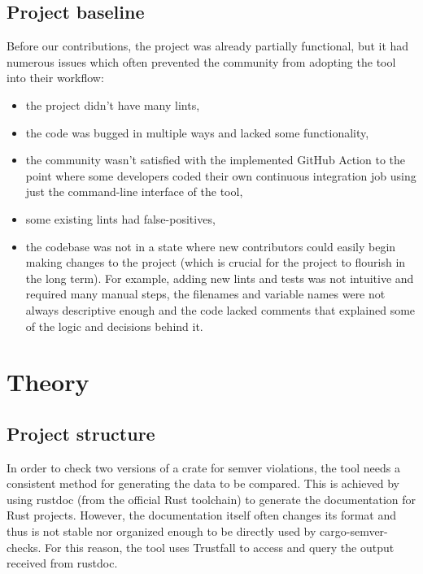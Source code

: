 \documentclass[licencjacka,en]{pracamgr}
\begin{document}
\section{Project baseline}

Before our contributions, the project was already partially functional, but it had numerous issues
which often prevented the community from adopting the tool into their workflow:
\begin{itemize}
	\item the project didn't have many lints,
	\item the code was bugged in multiple ways and lacked some functionality,
	\item the community wasn't satisfied with the implemented GitHub Action to the point where some
		developers coded their own continuous integration job using just the command-line interface
		of the tool,
	\item some existing lints had false-positives,
	\item the codebase was not in a state where new contributors could easily begin making changes
		to the project (which is crucial for the project to flourish in the long term).
		For example, adding new lints and tests was not intuitive and required many manual steps,
		the filenames and variable names were not always descriptive enough and the code lacked
		comments that explained some of the logic and decisions behind it.
\end{itemize}


\chapter{Theory}\label{r:chapter_theory}

\section{Project structure}\label{r:section_project_structure}
In order to check two versions of a crate for semver violations, the tool needs a consistent method
for generating the data to be compared. This is achieved by using rustdoc (from the official
Rust toolchain) to generate the documentation for Rust projects. However, the documentation itself
often changes its format and thus is not stable nor organized enough to be directly used by
cargo-semver-checks. For this reason, the tool uses Trustfall to access and query the output received from
rustdoc.
\end{document}
